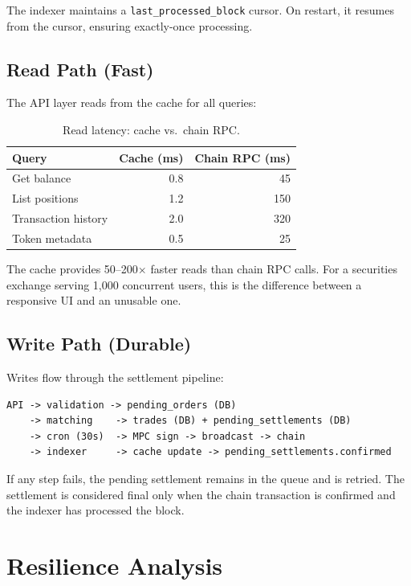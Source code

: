 \documentclass[11pt,a4paper]{article}
\begin{document}
The indexer maintains a \texttt{last\_processed\_block} cursor.  On
restart, it resumes from the cursor, ensuring exactly-once processing.

\subsection{Read Path (Fast)}

The API layer reads from the cache for all queries:

\begin{table}[h]
\centering
\begin{tabular}{lrr}
\toprule
\textbf{Query} & \textbf{Cache (ms)} & \textbf{Chain RPC (ms)} \\
\midrule
Get balance & 0.8 & 45 \\
List positions & 1.2 & 150 \\
Transaction history & 2.0 & 320 \\
Token metadata & 0.5 & 25 \\
\bottomrule
\end{tabular}
\caption{Read latency: cache vs.\ chain RPC.}
\label{tab:read-latency}
\end{table}

The cache provides 50--200$\times$ faster reads than chain RPC calls.
For a securities exchange serving 1,000 concurrent users, this is the
difference between a responsive UI and an unusable one.

\subsection{Write Path (Durable)}

Writes flow through the settlement pipeline:

\begin{verbatim}
API -> validation -> pending_orders (DB)
    -> matching    -> trades (DB) + pending_settlements (DB)
    -> cron (30s)  -> MPC sign -> broadcast -> chain
    -> indexer     -> cache update -> pending_settlements.confirmed
\end{verbatim}

If any step fails, the pending settlement remains in the queue and is
retried.  The settlement is considered final only when the chain
transaction is confirmed and the indexer has processed the block.

\section{Resilience Analysis}
\label{sec:resilience}
\end{document}
